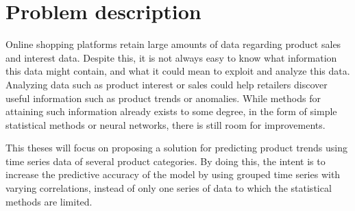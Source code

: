 
\section{Problem description}
\label{section:Introduction:ProblemDescription}
Online shopping platforms retain large amounts of data regarding product sales and interest data.
Despite this, it is not always easy to know what information this data might contain, and what it could mean to exploit and analyze this data.
Analyzing data such as product interest or sales could help retailers discover useful information such as product trends or anomalies.
While methods for attaining such information already exists to some degree, in the form of simple statistical methods or neural networks,
there is still room for improvements.


This theses will focus on proposing a solution for predicting product trends using time series data of several product categories.
By doing this, the intent is to increase the predictive accuracy of the model by using grouped time series with varying correlations,
instead of only one series of data to which the statistical methods are limited.


